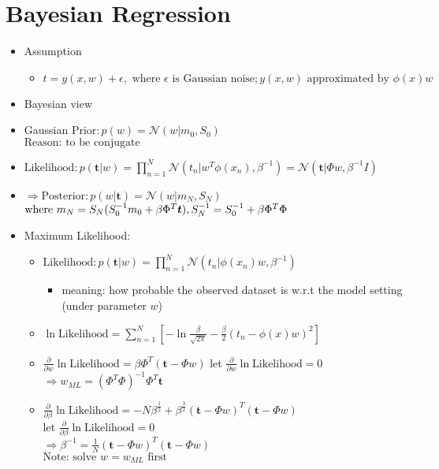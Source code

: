 \begin{itemize}
\end{itemize}

\section{Bayesian Regression}
\begin{itemize}
\item Assumption
	\begin{itemize}
	\item $t=y(x,w)+\epsilon,\text{ where } \epsilon \text{ is Gaussian noise}; y(x,w)\text{ approximated by }\phi(x)w$ 
	\end{itemize}
\item Bayesian view
\item Gaussian $\text{Prior}: p(w) = \mathcal N(w|m_0,S_0)$ \\
$\text{Reason: to be conjugate}$
\item $\text{Likelihood}: \displaystyle p(\boldsymbol t|w) = \prod_{n=1}^N\mathcal N(t_n|w^T\phi(x_n),\beta^{-1}) = \mathcal N(\boldsymbol t|\Phi w,\beta^{-1}I)$
\item $\Rightarrow \text{Posterior}: p(w|\boldsymbol t) = \mathcal N(w|m_N,S_N)$ \\
$\text{where } m_N = S_N(S_0^{-1}m_0+\beta \Phi^T\boldsymbol t),\space S_N^{-1} = S_0^{-1}+\beta \Phi^T\Phi $ 
\item Maximum Likelihood:
	\begin{itemize}
	\item $\text{Likelihood}: \displaystyle p(\boldsymbol t|w) = \prod_{n=1}^N\mathcal N(t_n|\phi(x_n)w,\beta^{-1})$ 
		\begin{itemize}
		\item meaning: how probable the observed dataset is w.r.t the model setting (under parameter $w$)
		\end{itemize}
	\item $\displaystyle \ln \text{Likelihood} = \sum_{n=1}^N [-\ln \frac {\beta} {\sqrt {2\pi}} - \frac \beta 2 (t_n-\phi(x)w)^2]$ 	
	\item $\displaystyle \frac {\partial} {\partial w} \ln \text{Likelihood} = \beta \Phi^T(\boldsymbol t-\Phi w)$ 
	let $\frac {\partial} {\partial w} \ln \text{Likelihood}=0$ \\
	$\displaystyle \Rightarrow w_{ML} = (\Phi^T\Phi)^{-1} \Phi^T\boldsymbol t $ 
	\item $\displaystyle \frac {\partial} {\partial \beta} \ln \text{Likelihood} = -N\beta^{\frac 1 2} + \beta^{\frac 3 2}(\boldsymbol t-\Phi w)^T(\boldsymbol t-\Phi w) $ \\
	let $\frac {\partial} {\partial \beta} \ln \text{Likelihood}=0$ \\
	$\displaystyle \Rightarrow \beta^{-1}=\frac 1 N (\boldsymbol t-\Phi w)^T(\boldsymbol t-\Phi w)$ \\
	\(\text{Note: solve $w=w_{ML}$ first}\)
	\end{itemize}


\end{itemize}
